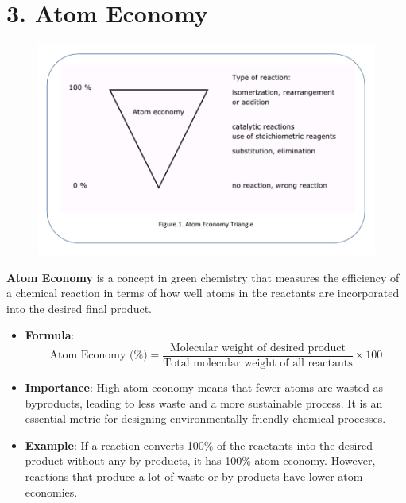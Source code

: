 \documentclass[11pt]{article}
\begin{document}
\section{3. Atom Economy}

\begin{figure}[H]
	\centering
	\includegraphics[width=.95\textwidth]{1670922781565.png}
\end{figure}

\textbf{Atom Economy} is a concept in green chemistry that measures the efficiency of a chemical reaction in terms of how well atoms in the reactants are incorporated into the desired final product.

\begin{itemize}
	\item \textbf{Formula}:
	      \[
		      \text{Atom Economy (\%)} = \frac{\text{Molecular weight of desired product}}{\text{Total molecular weight of all reactants}} \times 100
	      \]

	\item \textbf{Importance}: High atom economy means that fewer atoms are wasted as byproducts, leading to less waste and a more sustainable process. It is an essential metric for designing environmentally friendly chemical processes.

	\item \textbf{Example}: If a reaction converts 100\% of the reactants into the desired product without any by-products, it has 100\% atom economy. However, reactions that produce a lot of waste or by-products have lower atom economies.
\end{itemize}
\end{document}
